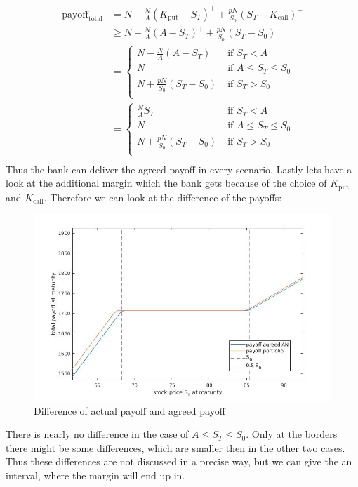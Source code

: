 \documentclass[11pt,oneside,a4paper]{article}
\begin{document}
	\begin{align*}
		\text{payoff}_{\text{total}} &= N - \frac{N}{A}(K_{\text{put}}-S_T)^+ + \frac{pN}{S_0}(S_T-K_{\text{call}})^+ \\
		&\geq N - \frac{N}{A}(A-S_T)^+ + \frac{pN}{S_0}(S_T-S_0)^+ \\
		&= \begin{cases}
		N - \frac{N}{A}(A - S_T) \; &\text{if } S_T < A \\
		N  \; &\text{if } A \leq S_T \leq S_0 \\
		N + \frac{pN}{S_0}(S_T-S_0) \; &\text{if }S_T > S_0 \\
		\end{cases} \\
		&= \begin{cases}
		\frac{N}{A} S_T \; &\text{if } S_T < A \\
		N  \; &\text{if } A \leq S_T \leq S_0 \\
		N + \frac{pN}{S_0}(S_T-S_0) \; &\text{if }S_T > S_0 \\
		\end{cases} \\
	\end{align*}
	Thus the bank can deliver the agreed payoff in every scenario.
	Lastly lets have a look at the additional margin which the bank gets because of the choice of $ K_\text{put} $ and $ K_{\text{call}} $. Therefore we can look at the difference of the payoffs:
	\begin{figure}[H]
		\centering
		\includegraphics[width=0.8\linewidth]{differenceAN.jpg}
		\caption{Difference of actual payoff and agreed payoff}
	\end{figure}
	There is nearly no difference in the case of $ A \leq S_T \leq S_0  $. Only at the borders there might be some differences, which are smaller then in the other two cases. Thus these differences are not discussed in a precise way, but we can give the an interval, where the margin will end up in.
	
\end{document}
